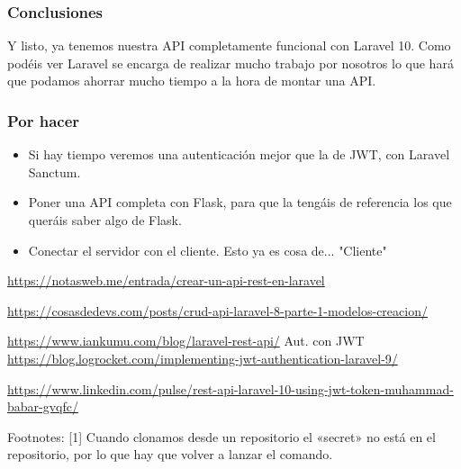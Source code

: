 \documentclass[11pt]{article}
\begin{document}
\subsubsection{Conclusiones}
\label{sec:orgfd920bd}
Y listo, ya tenemos nuestra API completamente funcional con
Laravel 10. Como podéis ver Laravel se encarga de realizar mucho
trabajo por nosotros lo que hará que podamos ahorrar mucho tiempo a la
hora de montar una API.

\subsubsection{Por hacer}
\label{sec:org9a93ebf}
\begin{itemize}
\item Si hay tiempo veremos una autenticación mejor que la de JWT, con
Laravel Sanctum.

\item Poner una API completa con Flask, para que la tengáis de referencia
los que queráis saber algo de Flask.

\item Conectar el servidor con el cliente. Esto ya es cosa de... "Cliente"
\end{itemize}



\url{https://notasweb.me/entrada/crear-un-api-rest-en-laravel}

\url{https://cosasdedevs.com/posts/crud-api-laravel-8-parte-1-modelos-creacion/}

\url{https://www.iankumu.com/blog/laravel-rest-api/}
Aut. con JWT
\url{https://blog.logrocket.com/implementing-jwt-authentication-laravel-9/}

\url{https://www.linkedin.com/pulse/rest-api-laravel-10-using-jwt-token-muhammad-babar-gvqfc/}



Footnotes:
[1] Cuando clonamos desde un repositorio el «secret» no está en el
repositorio, por lo que hay que volver a lanzar el comando.
\end{document}

